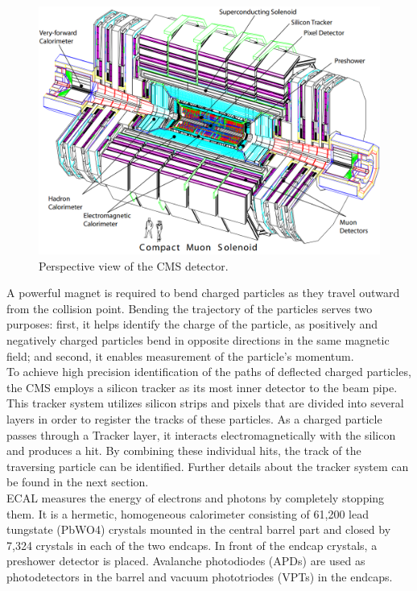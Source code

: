 \begin{center}
  \begin{figure}[ht]
    \centering
    \includegraphics[scale=.3]{Chapter2/CMS_detector_simple.png}
    \caption[Perspective view of the CMS detector]{Perspective view of the CMS detector.}
    \label{detector_CMS}
  \end{figure}
\end{center}

A powerful magnet is required to bend charged particles as they travel outward from the collision point. Bending the trajectory of the particles serves two purposes: first, it helps identify the charge of the particle, as positively and negatively charged particles bend in opposite directions in the same magnetic field; and second, it enables measurement of the particle's momentum.\\

To achieve high precision identification of the paths of deflected charged particles, the CMS employs a silicon tracker as its most inner detector to the beam pipe. This tracker system utilizes silicon strips and pixels that are divided into several layers in order to register the tracks of these particles. As a charged particle passes through a Tracker layer, it interacts electromagnetically with the silicon and produces a hit. By combining these individual hits, the track of the traversing particle can be identified. Further details about the tracker system can be found in the next section. \cite{CMS_Exp_2008}\\

ECAL measures the energy of electrons and photons by completely stopping them. It is a hermetic, homogeneous calorimeter consisting of 61,200 lead tungstate (PbWO4) crystals mounted in the central barrel part and closed by 7,324 crystals in each of the two endcaps. In front of the endcap crystals, a preshower detector is placed. Avalanche photodiodes (APDs) are used as photodetectors in the barrel and vacuum phototriodes (VPTs) in the endcaps.\\ 

